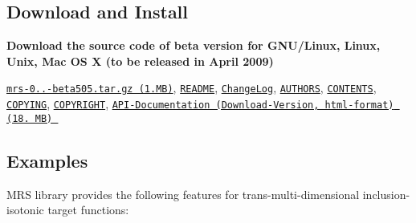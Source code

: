 \hypertarget{index_mainpage_sec_install}{}\subsection{\-Download and Install}\label{index_mainpage_sec_install}
{\bfseries  \-Download the source code of beta version for \-G\-N\-U/\-Linux, \-Linux, \-Unix, \-Mac \-O\-S \-X (to be released in \-April 2009)}
\begin{DoxyItemize}
\item \href{http://www.math.canterbury.ac.nz/~r.sainudiin/codes/mrs-0.1.2/mrs-0.1.2-beta505.tar.gz}{\tt mrs-\/0..-\/beta505.\-tar.\-gz (1.\-M\-B)}, \href{http://www.math.canterbury.ac.nz/~r.sainudiin/codes/mrs-0.1.2/README}{\tt \-R\-E\-A\-D\-M\-E}, \href{http://www.math.canterbury.ac.nz/~r.sainudiin/codes/mrs-0.1.2/ChangeLog}{\tt \-Change\-Log}, \href{http://www.math.canterbury.ac.nz/~r.sainudiin/codes/mrs-0.1.2/AUTHORS}{\tt \-A\-U\-T\-H\-O\-R\-S}, \href{http://www.math.canterbury.ac.nz/~r.sainudiin/codes/mrs-0.1.2/CONTENTS}{\tt \-C\-O\-N\-T\-E\-N\-T\-S}, \href{http://www.math.canterbury.ac.nz/~r.sainudiin/codes/mrs-0.1.2/COPYING}{\tt \-C\-O\-P\-Y\-I\-N\-G}, \href{http://www.math.canterbury.ac.nz/~r.sainudiin/codes/mrs-0.1.2/COPYRIGHT}{\tt \-C\-O\-P\-Y\-R\-I\-G\-H\-T}, \href{http://www.math.canterbury.ac.nz/~r.sainudiin/codes/mrs-0.1.2/docu-mrs-0.1.2-beta505.tar.gz}{\tt \-A\-P\-I-\/\-Documentation (\-Download-\/\-Version, html-\/format) (18. \-M\-B) }
\end{DoxyItemize}



\hypertarget{index_mainpage_sec_examples}{}\subsection{\-Examples}\label{index_mainpage_sec_examples}
\-M\-R\-S library provides the following features for trans-\/multi-\/dimensional inclusion-\/isotonic target functions\-:


